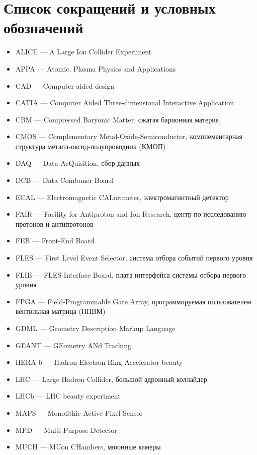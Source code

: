 \chapter*{Список сокращений и условных обозначений}

\begin{itemize}
\itemsep0pt
\item [] ALICE --- A Large Ion Collider Experiment
\item [] APPA --- Atomic, Plasma Physics and Applications
\item [] CAD --- Computer-aided design
\item [] CATIA --- Computer Aided Three-dimensional Interactive Application
\item [] CBM --- Compressed Baryonic Matter, сжатая барионная материя
\item [] CMOS --- Complementary Metal-Oxide-Semiconductor, комплементарная структура металл-оксид-полупроводник (КМОП)
\item [] DAQ --- Data AcQuisition, сбор данных
\item [] DCB --- Data Combuner Board
\item [] ECAL --- Electromagnetic CALorimeter, электромагнитный детектор
\item [] FAIR --- Facility for Antiproton and Ion Research, центр по исследованию протонов и антипротонов
\item [] FEB --- Front-End Board
\item [] FLES --- First Level Event Selector, система отбора событий первого уровня
\item [] FLIB --- FLES Interface Board, плата интерфейса системы отбора первого уровня
\item [] FPGA --- Field-Programmable Gate Array, программируемая пользователем вентильная матрица (ППВМ)
\item [] GDML --- Geometry Description Markup Language
\item [] GEANT --- GEometry ANd Tracking
\item [] HERA-b --- Hadron-Electron Ring Accelerator beauty
\item [] LHC --- Large Hadron Collider, большой адронный коллайдер
\item [] LHCb --- LHC beauty experiment
\item [] MAPS --- Monolithic Active Pixel Sensor
\item [] MPD --- Multi-Purpose Detector
\item [] MUCH --- MUon CHambers, мюонные камеры

\end{itemize}
